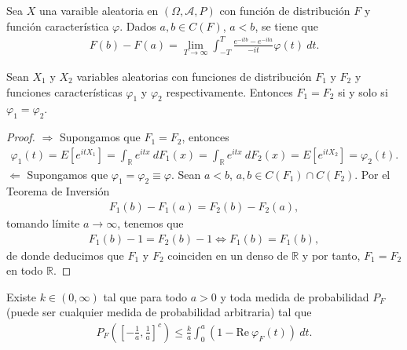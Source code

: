 \begin{cor}
    Sea $X$ una varaible aleatoria en $(\Omega, \mathcal{A}, P)$ con función de distribución $F$ y función característica $\varphi$. Dados $a,b \in C(F)$, $a < b$, se tiene que
    \begin{align*}
        F(b) - F(a) = \lim_{T \to \infty} \int_{-T}^{T} \frac{e^{-itb} - e^{-ita}}{-it} \varphi(t) \ dt.
    \end{align*}
\end{cor}

\begin{teo}
    Sean $X_1$ y $X_2$ variables aleatorias con funciones de distribución $F_1$ y $F_2$ y funciones características $\varphi_1$ y $\varphi_2$ respectivamente. Entonces $F_1 = F_2$ si y solo si $\varphi_1 = \varphi_2$.
\end{teo}

\begin{proof}
    $\boxed{\Longrightarrow}$ Supongamos que $F_1 = F_2$, entonces
    \begin{align*}
        \varphi_1(t) = E\left[ e^{itX_1} \right] = \int_{\mathbb{R}} e^{itx} \ dF_1(x) = \int_{\mathbb{R}} e^{itx} \ dF_2(x) = E\left[ e^{itX_2} \right] = \varphi_2(t).
    \end{align*}
    $\boxed{\Longleftarrow}$ Supongamos que $\varphi_1 = \varphi_2 \equiv \varphi$. Sean $a < b$, $a,b \in C(F_1) \cap C(F_2)$. Por el Teorema de Inversión
    \begin{align*}
        F_1(b) - F_1(a) = F_2(b) - F_2(a),
    \end{align*}
    tomando límite $a \to \infty$, tenemos que
    \begin{align*}
        F_1(b) - 1 = F_2(b) - 1 \Longleftrightarrow F_1(b) = F_1(b),
    \end{align*}
    de donde deducimos que $F_1$ y $F_2$ coinciden en un denso de $\mathbb{R}$ y por tanto, $F_1 = F_2$ en todo $\mathbb{R}$.
\end{proof}

\begin{teo}
    Existe $k \in (0,\infty)$ tal que para todo $a > 0$ y toda medida de probabilidad $P_F$ (puede ser cualquier medida de probabilidad arbitraria) tal que
    \begin{align*}
        P_F\left( \left[ - \frac{1}{a}, \frac{1}{a} \right]^c \right) \leq \frac{k}{a} \int_{0}^{a} (1 - \text{Re} \ \varphi_F(t)) \ dt.
    \end{align*}
\end{teo}

